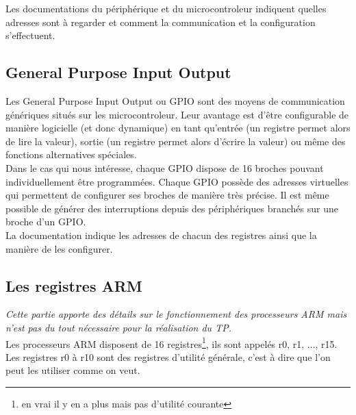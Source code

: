 \documentclass[a4paper,10pt]{article} %
\begin{document}
Les documentations du périphérique et du microcontroleur indiquent quelles adresses sont à regarder et comment la communication et la configuration s'effectuent.

\subsection{General Purpose Input Output}
Les General Purpose Input Output ou GPIO sont des moyens de communication génériques situés sur les microcontroleur. Leur avantage est d'être configurable de manière logicielle (et donc dynamique) en tant qu'entrée (un registre permet alors de lire la valeur), sortie (un registre permet alors d'écrire la valeur) ou même des fonctions alternatives spéciales.\\

Dans le cas qui nous intéresse, chaque GPIO dispose de 16 broches pouvant individuellement être programmées. Chaque GPIO possède des adresses virtuelles qui permettent de configurer ses broches de manière très précise. Il est même possible de générer des interruptions depuis des périphériques branchés sur une broche d'un GPIO.\\

La documentation indique les adresses de chacun des registres ainsi que la manière de les configurer.

\subsection{Les registres ARM}
\textit{Cette partie apporte des détails sur le fonctionnement des processeurs ARM mais n'est pas du tout nécessaire pour la réalisation du TP.}\\

Les processeurs ARM disposent de 16 registres\footnote{en vrai il y en a plus mais pas d'utilité courante}, ils sont appelés r0, r1, ..., r15.\\

Les registres r0 à r10 sont des registres d'utilité générale, c'est à dire que l'on peut les utiliser comme on veut.\\
\end{document}
